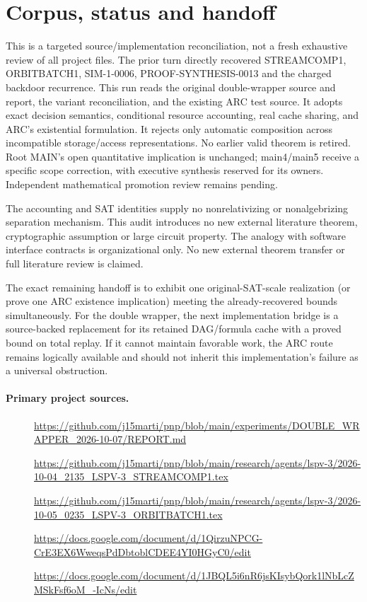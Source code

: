 \documentclass[11pt]{article}
\begin{document}
\section*{Corpus, status and handoff}
This is a targeted source/implementation reconciliation, not a fresh exhaustive
review of all project files. The prior turn directly recovered STREAMCOMP1,
ORBITBATCH1, SIM-1-0006, PROOF-SYNTHESIS-0013 and the charged backdoor recurrence.
This run reads the original double-wrapper source and report, the variant
reconciliation, and the existing ARC test source. It adopts exact decision
semantics, conditional resource accounting, real cache sharing, and ARC's
existential formulation. It rejects only automatic composition across
incompatible storage/access representations. No earlier valid theorem is
retired. Root MAIN's open quantitative implication is unchanged; main4/main5
receive a specific scope correction, with executive synthesis reserved for its
owners. Independent mathematical promotion review remains pending.

The accounting and SAT identities supply no nonrelativizing or nonalgebrizing
separation mechanism. This audit introduces no new external literature theorem,
cryptographic assumption or large circuit property. The analogy with software
interface contracts is organizational only. No new external theorem transfer
or full literature review is claimed.

The exact remaining handoff is to exhibit one original-SAT-scale realization
(or prove one ARC existence implication) meeting the already-recovered bounds
simultaneously. For the double wrapper, the next implementation bridge is a
source-backed replacement for its retained DAG/formula cache with a proved
bound on total replay. If it cannot maintain favorable work, the ARC route
remains logically available and should not inherit this implementation's
failure as a universal obstruction.

\paragraph{Primary project sources.}
\begin{description}
\item[] \url{https://github.com/j15marti/pnp/blob/main/experiments/DOUBLE_WRAPPER_2026-10-07/REPORT.md}
\item[] \url{https://github.com/j15marti/pnp/blob/main/research/agents/lspv-3/2026-10-04_2135_LSPV-3_STREAMCOMP1.tex}
\item[] \url{https://github.com/j15marti/pnp/blob/main/research/agents/lspv-3/2026-10-05_0235_LSPV-3_ORBITBATCH1.tex}
\item[] \url{https://docs.google.com/document/d/1QirzuNPCG-CrE3EX6WweqsPdDbtoblCDEE4YI0HGyC0/edit}
\item[] \url{https://docs.google.com/document/d/1JBQL5i6nR6jsKIsybQork1lNbLcZMSkFsf6oM_-IcNs/edit}
\end{description}
\end{document}
